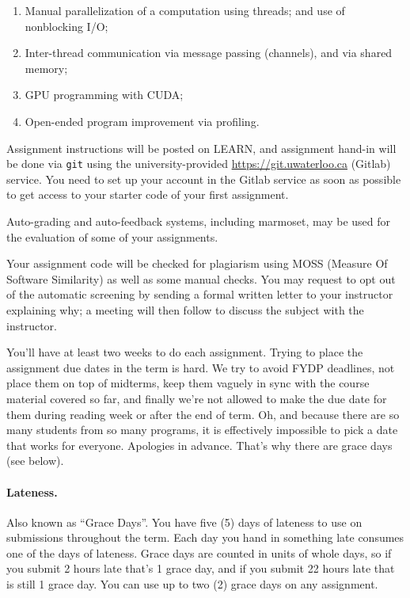 \documentclass[letterpaper,10pt]{article}
\begin{document}
\begin{enumerate}
\item Manual parallelization of a computation using threads; and use of nonblocking I/O;
\item Inter-thread communication via message passing (channels), and via shared memory;
\item GPU programming with CUDA;
\item Open-ended program improvement via profiling.
\end{enumerate}
Assignment instructions will be posted on LEARN, and assignment hand-in will be done via \texttt{git} using the university-provided \url{https://git.uwaterloo.ca} (Gitlab) service. You need to set up your account in the Gitlab service as soon as possible to get access to your starter code of your first assignment.

Auto-grading and auto-feedback systems, including marmoset, may be used for the evaluation of some of your assignments.

Your assignment code will be checked for plagiarism using MOSS (Measure Of Software Similarity) as well as some manual checks. You may request to opt out of the automatic screening by sending a formal written letter to your instructor explaining why; a meeting will then follow to discuss the subject with the instructor. 

You'll have at least two weeks to do each assignment. Trying to place the assignment due dates in the term is hard. We try to avoid FYDP deadlines, not place them on top of midterms, keep them vaguely in sync with the course material covered so far, and finally we're not allowed to make the due date for them during reading week or after the end of term. Oh, and because there are so many students from so many programs, it is effectively impossible to pick a date that works for everyone. Apologies in advance. That's why there are grace days (see below).


\paragraph{Lateness.} Also known as ``Grace Days''. You have five (5) days of lateness to use on  submissions throughout the term. Each day you hand in something late consumes one of the days of lateness. Grace days are counted in units of whole days, so if you submit 2 hours late that's 1 grace day, and if you submit 22 hours late that is still 1 grace day. You can use up to two (2) grace days on any assignment. 
\end{document}

